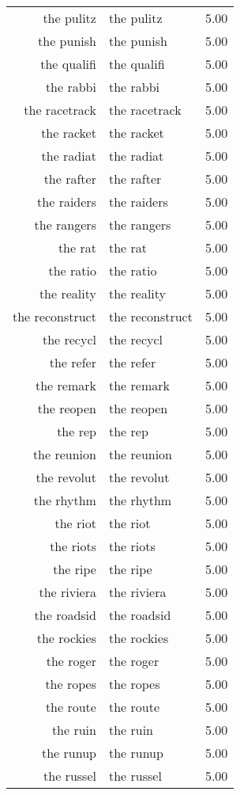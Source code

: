 \begin{table}[ht]
\begin{tabular}{rlr}
  the pulitz & the pulitz & 5.00 \\ 
  the punish & the punish & 5.00 \\ 
  the qualifi & the qualifi & 5.00 \\ 
  the rabbi & the rabbi & 5.00 \\ 
  the racetrack & the racetrack & 5.00 \\ 
  the racket & the racket & 5.00 \\ 
  the radiat & the radiat & 5.00 \\ 
  the rafter & the rafter & 5.00 \\ 
  the raiders & the raiders & 5.00 \\ 
  the rangers & the rangers & 5.00 \\ 
  the rat & the rat & 5.00 \\ 
  the ratio & the ratio & 5.00 \\ 
  the reality & the reality & 5.00 \\ 
  the reconstruct & the reconstruct & 5.00 \\ 
  the recycl & the recycl & 5.00 \\ 
  the refer & the refer & 5.00 \\ 
  the remark & the remark & 5.00 \\ 
  the reopen & the reopen & 5.00 \\ 
  the rep & the rep & 5.00 \\ 
  the reunion & the reunion & 5.00 \\ 
  the revolut & the revolut & 5.00 \\ 
  the rhythm & the rhythm & 5.00 \\ 
  the riot & the riot & 5.00 \\ 
  the riots & the riots & 5.00 \\ 
  the ripe & the ripe & 5.00 \\ 
  the riviera & the riviera & 5.00 \\ 
  the roadsid & the roadsid & 5.00 \\ 
  the rockies & the rockies & 5.00 \\ 
  the roger & the roger & 5.00 \\ 
  the ropes & the ropes & 5.00 \\ 
  the route & the route & 5.00 \\ 
  the ruin & the ruin & 5.00 \\ 
  the runup & the runup & 5.00 \\ 
  the russel & the russel & 5.00 \\ 

\end{tabular}
\end{table}
